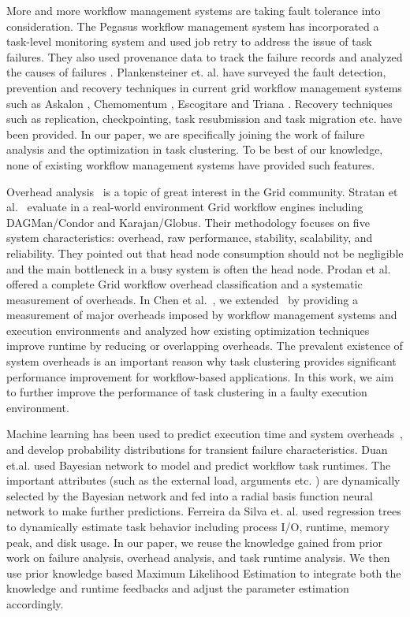 \documentclass{IOS-Book-Article}
\begin{document}
More and more workflow management systems are taking fault tolerance into consideration. The Pegasus workflow management system \cite{Deelman2004} has incorporated a task-level monitoring system and used job retry to address the issue of task failures. They also used provenance data to track the failure records and analyzed the causes of failures \cite{Samak2011}. Plankensteiner et. al. \cite{plankensteiner2009fault} have surveyed the fault detection, prevention and recovery techniques in current grid workflow management systems such as Askalon \cite{fahringer2007askalon}, Chemomentum \cite{schuller2008chemomentum}, Escogitare \cite{laforenza2007biological} and Triana \cite{taylor2007triana}. Recovery techniques such as replication, checkpointing, task resubmission  and task migration etc. have been provided. In our paper, we are specifically joining the work of failure analysis and the optimization in task clustering. To be best of our knowledge, none of existing workflow management systems have provided such features. 

Overhead analysis~\cite{Ostberg2011, Prodan2008} is a topic of great interest in the Grid community. Stratan et al.~\cite{Stratan2008} evaluate in a real-world environment Grid workflow engines including DAGMan/Condor and Karajan/Globus. Their methodology focuses on five system characteristics: overhead, raw performance, stability, scalability, and reliability. They pointed out that head node consumption should not be negligible and the main bottleneck in a busy system is often the head node. Prodan et al.~\cite{Prodan2008} offered a complete Grid workflow overhead classification and a systematic measurement of overheads. In Chen et al.~\cite{Chen2011}, we extended~\cite{Prodan2008} by providing a measurement of major overheads imposed by workflow management systems and execution environments and analyzed how existing optimization techniques improve runtime by reducing or overlapping overheads. The prevalent existence of system overheads is an important reason why task clustering provides significant performance improvement for workflow-based applications. In this work, we aim to further improve the performance of task clustering in a faulty execution environment. 

Machine learning has been used to predict execution time \cite{Rubing2009, 1015660, 1542747, da2013toward} and system overheads~\cite{Chen2011}, and develop probability distributions for transient failure characteristics. Duan et.al. \cite{Rubing2009} used Bayesian network to model and predict workflow task runtimes. The important attributes (such as the external load, arguments etc. ) are dynamically selected by the Bayesian network and fed into a radial basis function neural network to make further predictions. Ferreira da Silva et. al. \cite{da2013toward} used regression trees to dynamically estimate task behavior including process I/O, runtime, memory peak, and disk usage. In our paper, we reuse the knowledge gained from prior work on failure analysis, overhead analysis, and task runtime analysis. We then use prior knowledge based Maximum Likelihood Estimation to integrate both the knowledge and runtime feedbacks and adjust the parameter estimation accordingly. 
\end{document}
